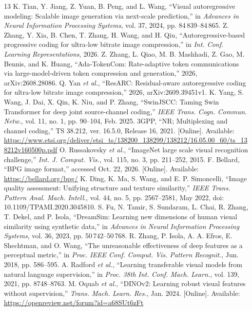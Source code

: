 \begin{thebibliography}{13}
 K. Tian, Y. Jiang, Z. Yuan, B. Peng, and L. Wang, ``Visual autoregressive modeling: Scalable image generation via next-scale prediction,'' in \emph{Advances in Neural Information Processing Systems}, vol. 37, 2024, pp. 84\,839--84\,865.
 Z. Zhang, Y. Xia, B. Chen, T. Zhang, H. Wang, and H. Qiu, ``Autoregressive-based progressive coding for ultra-low bitrate image compression,'' in \emph{Int. Conf. Learning Representations}, 2026.
 Z. Zhang, L. Qiao, M. B. Mashhadi, Z. Gao, M. Bennis, and K. Huang, ``Ada-TokenCom: Rate-adaptive token communications via large-model-driven token compression and generation,'' 2026, arXiv:2608.28086.
 Q. Yan \emph{et al.}, ``ResARC: Residual-aware autoregressive coding for ultra-low bitrate image compression,'' 2026, arXiv:2609.39451v1.
 K. Yang, S. Wang, J. Dai, X. Qin, K. Niu, and P. Zhang, ``SwinJSCC: Taming Swin Transformer for deep joint source-channel coding,'' \emph{IEEE Trans. Cogn. Commun. Netw.}, vol. 11, no. 1, pp. 90--104, Feb. 2025.
 3GPP, ``NR; Multiplexing and channel coding,'' TS 38.212, ver. 16.5.0, Release 16, 2021. [Online]. Available: \url{https://www.etsi.org/deliver/etsi_ts/138200_138299/138212/16.05.00_60/ts_138212v160500p.pdf}
 O. Russakovsky \emph{et al.}, ``ImageNet large scale visual recognition challenge,'' \emph{Int. J. Comput. Vis.}, vol. 115, no. 3, pp. 211--252, 2015.
 F. Bellard, ``BPG image format,'' accessed Oct. 22, 2026. [Online]. Available: \url{https://bellard.org/bpg/}
 K. Ding, K. Ma, S. Wang, and E. P. Simoncelli, ``Image quality assessment: Unifying structure and texture similarity,'' \emph{IEEE Trans. Pattern Anal. Mach. Intell.}, vol. 44, no. 5, pp. 2567--2581, May 2022, doi: 10.1109/TPAMI.2020.3045810.
 S. Fu, N. Tamir, S. Sundaram, L. Chai, R. Zhang, T. Dekel, and P. Isola, ``DreamSim: Learning new dimensions of human visual similarity using synthetic data,'' in \emph{Advances in Neural Information Processing Systems}, vol. 36, 2023, pp. 50\,742--50\,768.
 R. Zhang, P. Isola, A. A. Efros, E. Shechtman, and O. Wang, ``The unreasonable effectiveness of deep features as a perceptual metric,'' in \emph{Proc. IEEE Conf. Comput. Vis. Pattern Recognit.}, Jun. 2018, pp. 586--595.
 A. Radford \emph{et al.}, ``Learning transferable visual models from natural language supervision,'' in \emph{Proc. 38th Int. Conf. Mach. Learn.}, vol. 139, 2021, pp. 8748--8763.
 M. Oquab \emph{et al.}, ``DINOv2: Learning robust visual features without supervision,'' \emph{Trans. Mach. Learn. Res.}, Jan. 2024. [Online]. Available: \url{https://openreview.net/forum?id=a68SUt6zFt}
\end{thebibliography}
